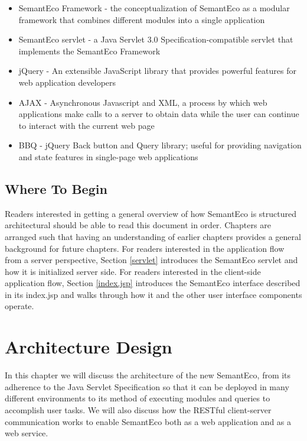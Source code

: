 \documentclass[letterpaper]{report}
\begin{document}
\begin{itemize}
\item SemantEco Framework - the conceptualization of SemantEco as a modular framework that combines different modules into a single application
\item SemantEco servlet - a Java Servlet 3.0 Specification-compatible servlet that implements the SemantEco Framework
\item jQuery - An extensible JavaScript library that provides powerful features for web application developers
\item AJAX - Asynchronous Javascript and XML, a process by which web applications make calls to a server to obtain data while the user can continue to interact with the current web page
\item BBQ - jQuery Back button and Query library; useful for providing navigation and state features in single-page web applications
\end{itemize}

\section{Where To Begin}
Readers interested in getting a general overview of how SemantEco is structured architectural should be able to read this document in order. Chapters are arranged such that having an understanding of earlier chapters provides a general background for future chapters. For readers interested in the application flow from a server perspective, Section \ref{servlet} introduces the SemantEco servlet and how it is initialized server side. For readers interested in the client-side application flow, Section \ref{index.jsp} introduces the SemantEco interface described in its index.jsp and walks through how it and the other user interface components operate.

\chapter{Architecture Design}
\label{architecture}
In this chapter we will discuss the architecture of the new SemantEco, from its adherence to the Java Servlet Specification so that it can be deployed in many different environments to its method of executing modules and queries to accomplish user tasks. We will also discuss how the RESTful client-server communication works to enable SemantEco both as a web application and as a web service.
\end{document}
